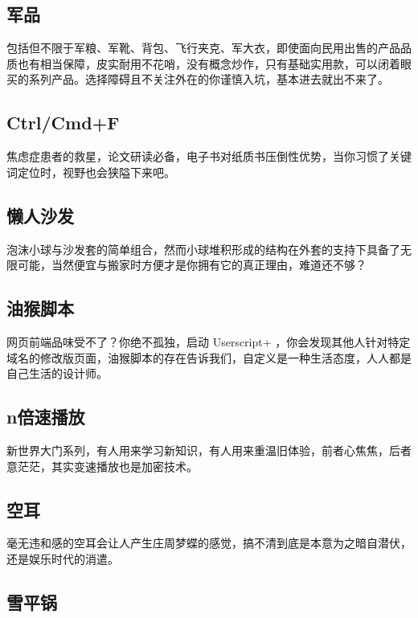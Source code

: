 \documentclass[
  letterpaper,
  DIV=11,
  numbers=noendperiod]{scrreprt}
\begin{document}
\subsection{军品}\label{ux519bux54c1}

包括但不限于军粮、军靴、背包、飞行夹克、军大衣，即使面向民用出售的产品品质也有相当保障，皮实耐用不花哨，没有概念炒作，只有基础实用款，可以闭着眼买的系列产品。选择障碍且不关注外在的你谨慎入坑，基本进去就出不来了。

\subsection{Ctrl/Cmd+F}\label{ctrlcmdf}

焦虑症患者的救星，论文研读必备，电子书对纸质书压倒性优势，当你习惯了关键词定位时，视野也会狭隘下来吧。

\subsection{懒人沙发}\label{ux61d2ux4ebaux6c99ux53d1}

泡沫小球与沙发套的简单组合，然而小球堆积形成的结构在外套的支持下具备了无限可能，当然便宜与搬家时方便才是你拥有它的真正理由，难道还不够？

\subsection{油猴脚本}\label{ux6cb9ux7334ux811aux672c}

网页前端品味受不了？你绝不孤独，启动 Userscript+
，你会发现其他人针对特定域名的修改版页面，油猴脚本的存在告诉我们，自定义是一种生活态度，人人都是自己生活的设计师。

\subsection{n倍速播放}\label{nux500dux901fux64adux653e}

新世界大门系列，有人用来学习新知识，有人用来重温旧体验，前者心焦焦，后者意茫茫，其实变速播放也是加密技术。

\subsection{空耳}\label{ux7a7aux8033}

毫无违和感的空耳会让人产生庄周梦蝶的感觉，搞不清到底是本意为之暗自潜伏，还是娱乐时代的消遣。

\subsection{雪平锅}\label{ux96eaux5e73ux9505}
\end{document}
